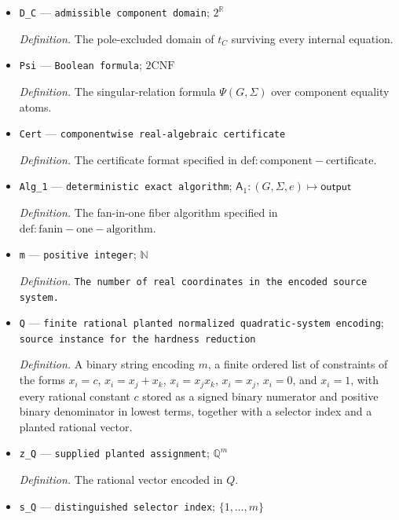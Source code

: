 \documentclass{article}
\begin{document}
\begin{itemize}
  \par\smallskip\noindent\emph{Definition.} The Möbius maps obtained by multiplying invertible \(2\times2\) rational relation matrices along a spanning tree of \(C\).
  \item \texttt{D\_\allowbreak{}C} --- \texttt{admissible component domain}; \(2^{\mathbb R}\)
  \par\smallskip\noindent\emph{Definition.} The pole-excluded domain of \(t_C\) surviving every internal equation.
  \item \texttt{Psi} --- \texttt{Boolean formula}; \(\mathrm{2CNF}\)
  \par\smallskip\noindent\emph{Definition.} The singular-relation formula \(\Psi(G,\Sigma)\) over component equality atoms.
  \item \texttt{Cert} --- \texttt{componentwise real-\allowbreak{}algebraic certificate}
  \par\smallskip\noindent\emph{Definition.} The certificate format specified in \(\mathrm{def:component-certificate}\).
  \item \texttt{Alg\_\allowbreak{}1} --- \texttt{deterministic exact algorithm}; \(\mathsf A_1:(G,\Sigma,e)\mapsto\mathsf{output}\)
  \par\smallskip\noindent\emph{Definition.} The fan-in-one fiber algorithm specified in \(\mathrm{def:fanin-one-algorithm}\).
  \item \texttt{m} --- \texttt{positive integer}; \(\mathbb N\)
  \par\smallskip\noindent\emph{Definition.} \texttt{The number of real coordinates in the encoded source system.}
  \item \texttt{Q} --- \texttt{finite rational planted normalized quadratic-\allowbreak{}system encoding}; \texttt{source instance for the hardness reduction}
  \par\smallskip\noindent\emph{Definition.} A binary string encoding \(m\), a finite ordered list of constraints of the forms \(x_i=c\), \(x_i=x_j+x_k\), \(x_i=x_jx_k\), \(x_i=x_j\), \(x_i=0\), and \(x_i=1\), with every rational constant \(c\) stored as a signed binary numerator and positive binary denominator in lowest terms, together with a selector index and a planted rational vector.
  \item \texttt{z\_\allowbreak{}Q} --- \texttt{supplied planted assignment}; \(\mathbb Q^m\)
  \par\smallskip\noindent\emph{Definition.} The rational vector encoded in \(Q\).
  \item \texttt{s\_\allowbreak{}Q} --- \texttt{distinguished selector index}; \(\{1,\ldots,m\}\)

\end{itemize}
\end{document}
